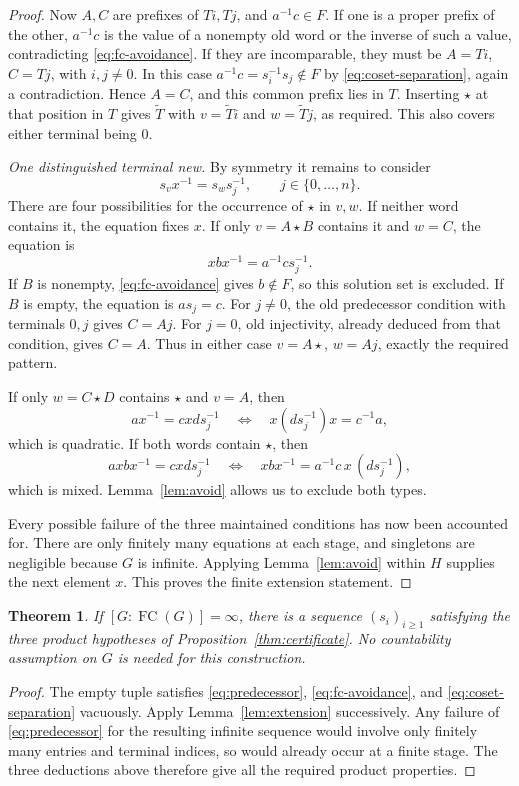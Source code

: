 \documentclass[11pt,letterpaper]{amsart}
\newtheorem{theorem}{Theorem}[section]
\theoremstyle{definition}
\theoremstyle{remark}
\DeclareMathOperator{\FC}{FC}
\begin{document}
\begin{proof}
Now $A,C$ are prefixes of $Ti,Tj$, and $a^{-1}c\in F$.
If one is a proper prefix of the other, $a^{-1}c$ is the value of
a nonempty old word or the inverse of such a value, contradicting
\eqref{eq:fc-avoidance}. If they are incomparable, they must be
$A=Ti$, $C=Tj$, with $i,j\ne0$. In this case
$a^{-1}c=s_i^{-1}s_j\notin F$ by \eqref{eq:coset-separation},
again a contradiction. Hence $A=C$, and this common prefix lies
in $T$. Inserting $\star$ at that position in $T$ gives
$\widetilde T$ with $v=\widetilde Ti$ and $w=\widetilde Tj$,
as required. This also covers either terminal being $0$.

\smallskip\noindent
\emph{One distinguished terminal new.}
By symmetry it remains to consider
\begin{equation}\label{eq:newterminal}
 s_vx^{-1}=s_ws_j^{-1},\qquad j\in\{0,\ldots,n\}.
\end{equation}
There are four possibilities for the occurrence of $\star$ in $v,w$.
If neither word contains it, the equation fixes $x$.
If only $v=A\star B$ contains it and $w=C$, the equation is
\[
 xbx^{-1}=a^{-1}c s_j^{-1}.
\]
If $B$ is nonempty, \eqref{eq:fc-avoidance} gives $b\notin F$,
so this solution set is excluded. If $B$ is empty, the equation is
$as_j=c$. For $j\ne0$, the old predecessor condition with terminals
$0,j$ gives $C=Aj$. For $j=0$, old injectivity, already deduced from
that condition, gives $C=A$. Thus in either case
$v=A\star$, $w=Aj$, exactly the required pattern.

If only $w=C\star D$ contains $\star$ and $v=A$, then
\[
 ax^{-1}=cxd s_j^{-1}
 \quad\Longleftrightarrow\quad x(ds_j^{-1})x=c^{-1}a,
\]
which is quadratic. If both words contain $\star$, then
\[
 axbx^{-1}=cxd s_j^{-1}
 \quad\Longleftrightarrow\quad
 xbx^{-1}=a^{-1}c\,x\,(ds_j^{-1}),
\]
which is mixed. Lemma~\ref{lem:avoid} allows us to exclude both types.

Every possible failure of the three maintained conditions has now been
accounted for. There are only finitely many equations at each stage,
and singletons are negligible because $G$ is infinite. Applying
Lemma~\ref{lem:avoid} within $H$ supplies the next element $x$.
This proves the finite extension statement.
\end{proof}

\begin{theorem}\label{thm:sequence}
If $[G:\FC(G)]=\infty$, there is a sequence $(s_i)_{i\geq1}$
satisfying the three product hypotheses of
Proposition~\ref{thm:certificate}. No countability assumption on $G$
is needed for this construction.
\end{theorem}
\begin{proof}
The empty tuple satisfies \eqref{eq:predecessor},
\eqref{eq:fc-avoidance}, and \eqref{eq:coset-separation}
vacuously. Apply Lemma~\ref{lem:extension}
successively. Any failure of \eqref{eq:predecessor} for the resulting
infinite sequence would involve only finitely many entries and
terminal indices, so would already occur at a finite stage. The
three deductions above therefore give all the required product
properties.
\end{proof}
\end{document}
